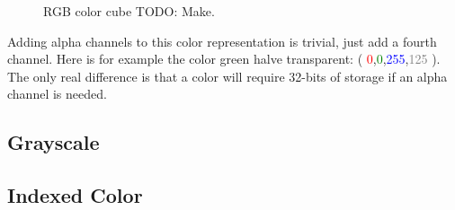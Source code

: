 \begin{refsection}
  \begin{figure}[h!]
    \centering
    \caption{RGB color cube TODO: Make.}
    \label{fig:color-cube}
  \end{figure}

  \newcommand{\rgbaquad}[4]{(
    \textcolor{red}{#1},\textcolor{green}{#2},\textcolor{blue}{#3},\textcolor{gray}{#4} )}

  Adding alpha channels to this color representation is trivial, just
  add a fourth channel. Here is for example the color green halve
  transparent: \rgbaquad{0}{0}{255}{125}. The only real difference is
  that a color will require 32-bits of storage if an alpha channel is needed.

  \subsection{Grayscale}
  \label{sec:other-colors-depths}


  \subsection{Indexed Color}
  \label{sec:indexed-color}


  \printbibliography[heading=subbibliography]
\end{refsection}